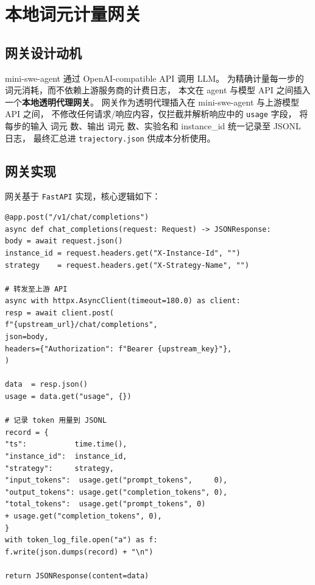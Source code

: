\section{本地词元计量网关}
\label{sec:gateway}

\subsection{网关设计动机}
\label{subsec:gateway-motivation}

mini-swe-agent 通过 OpenAI-compatible API 调用 LLM。
为精确计量每一步的词元消耗，而不依赖上游服务商的计费日志，
本文在 agent 与模型 API 之间插入一个\textbf{本地透明代理网关}。
网关作为透明代理插入在 mini-swe-agent 与上游模型 API 之间，
不修改任何请求/响应内容，仅拦截并解析响应中的 \texttt{usage} 字段，
将每步的输入 词元 数、输出 词元 数、实验名和 instance\_id 统一记录至 JSONL 日志，
最终汇总进 \texttt{trajectory.json} 供成本分析使用。

\subsection{网关实现}
\label{subsec:gateway-impl}

网关基于 \texttt{FastAPI} 实现，核心逻辑如下：

\begin{lstlisting}[style=promptstyle, caption={网关核心：拦截 token 用量并记录（节选自 src/gateway/server.py）}, label={lst:gateway-core}]
@app.post("/v1/chat/completions")
async def chat_completions(request: Request) -> JSONResponse:
body = await request.json()
instance_id = request.headers.get("X-Instance-Id", "")
strategy    = request.headers.get("X-Strategy-Name", "")

# 转发至上游 API
async with httpx.AsyncClient(timeout=180.0) as client:
resp = await client.post(
f"{upstream_url}/chat/completions",
json=body,
headers={"Authorization": f"Bearer {upstream_key}"},
)

data  = resp.json()
usage = data.get("usage", {})

# 记录 token 用量到 JSONL
record = {
"ts":           time.time(),
"instance_id":  instance_id,
"strategy":     strategy,
"input_tokens":  usage.get("prompt_tokens",     0),
"output_tokens": usage.get("completion_tokens", 0),
"total_tokens":  usage.get("prompt_tokens", 0)
+ usage.get("completion_tokens", 0),
}
with token_log_file.open("a") as f:
f.write(json.dumps(record) + "\n")

return JSONResponse(content=data)
\end{lstlisting}

